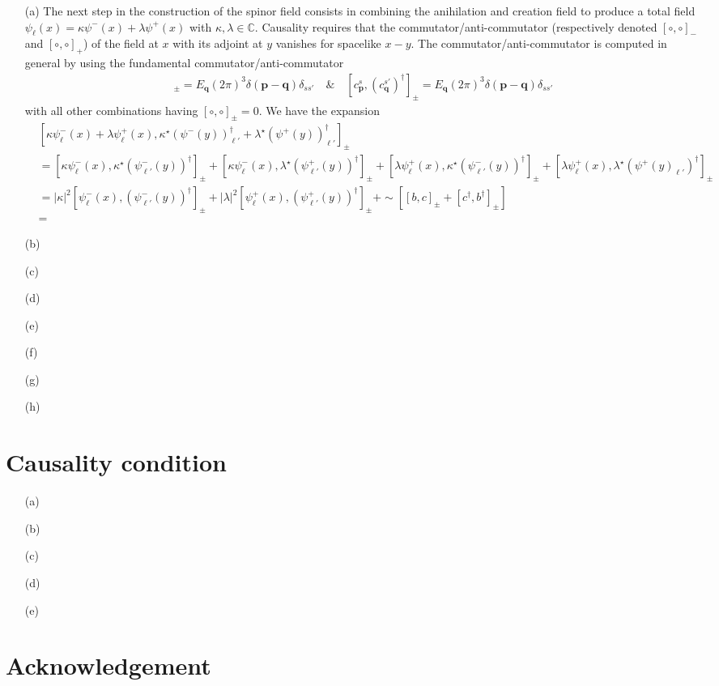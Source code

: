 \documentclass[10pt, a4paper]{article}
\begin{document}
\begin{enumerate}
  \item[(a)] The next step in the construction of the spinor field consists in combining the anihilation and creation field to produce a total field $\psi_\ell(x) = \kappa \psi^-(x) + \lambda \psi^+(x)$ with $\kappa, \lambda \in \mathbb{C}$. Causality requires that the commutator/anti-commutator (respectively denoted $[\circ,\circ]_-$ and $[\circ,\circ]_+$) of the field at $x$ with its adjoint at $y$ vanishes for spacelike $x-y$. The commutator/anti-commutator is computed in general by using the fundamental commutator/anti-commutator
  \begin{align*}
    [b^{s}_\mathbf{p}, (b^{s'}_\mathbf{q})^\dagger]_{\pm} = E_\mathbf{q} (2\pi)^3 \delta(\mathbf{p} - \mathbf{q})\delta_{ss'} \quad \& \quad [c^{s}_\mathbf{p}, (c^{s'}_\mathbf{q})^\dagger]_{\pm} = E_\mathbf{q} (2\pi)^3 \delta(\mathbf{p} - \mathbf{q})\delta_{ss'} 
  \end{align*}
  with all other combinations having $[\circ,\circ]_\pm = 0$. We have the expansion 
  \begin{align*}
    &[\kappa \psi^-_\ell(x) + \lambda \psi^+_\ell(x), \kappa^\star (\psi^-(y))_{\ell'}^{\dagger} + \lambda^\star (\psi^+(y))_{\ell'}^\dagger]_{\pm}\\
    &= [\kappa \psi^-_{\ell}(x), \kappa^\star (\psi^-_{\ell'}(y))^{\dagger}]_{\pm} + [\kappa \psi^-_{\ell}(x),\lambda^\star (\psi^+_{\ell'}(y))^\dagger]_{\pm} + [\lambda \psi^+_{\ell}(x), \kappa^\star (\psi^-_{\ell'}(y))^{\dagger}]_{\pm} + [\lambda \psi^+_{\ell}(x), \lambda^\star (\psi^+(y)_{\ell'})^\dagger]_{\pm}\\
    &=|\kappa|^2[\psi^-_{\ell}(x), (\psi^-_{\ell'}(y))^{\dagger}]_{\pm} + |\lambda|^2[ \psi^+_{\ell}(x), (\psi^+_{\ell'}(y))^\dagger]_{\pm} +\sim \left[ [b,c]_{\pm} + [c^\dagger, b^{\dagger}]_{\pm}\right]\\
    &= 
  \end{align*}
  \item[(b)]
  \item[(c)]
  \item[(d)] 
  \item[(e)]
  \item[(f)]
  \item[(g)]
  \item[(h)]     
\end{enumerate}

\section{Causality condition}
\begin{enumerate}
  \item[(a)]
  \item[(b)]
  \item[(c)]
  \item[(d)] 
  \item[(e)]   
\end{enumerate}


\section{Acknowledgement}



\makereferences


\end{document}
